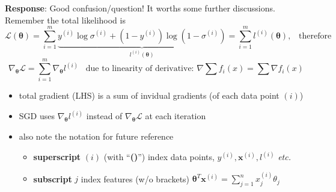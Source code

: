 \documentclass[ignorenonframetext,aspectratio=169]{beamer}
\providecommand{\tightlist}{%
  \setlength{\itemsep}{0pt}\setlength{\parskip}{0pt}}
\newcommand{\vv}[1]{\boldsymbol{#1}}
\newcommand{\di}[2]{\ensuremath{ #1^{(#2)}}}
\newcommand{\dd}[1]{\ensuremath{ #1^{(i)}}}
\newcommand{\Di}[2]{\ensuremath{ \vv{#1}^{(#2)}}}
\begin{document}
\begin{frame}{}
\protect\hypertarget{section}{}

\textbf{Response}: Good confusion/question! It worths some further
discussions. Remember the total likelihood is
\[\mathcal{L}(\vv{\theta}) =\sum_{i=1}^m  \underbrace{\dd{y} \log \sigma^{(i)}+(1-\dd{y})\log(1-\sigma^{(i)})}_{\dd{l}(\vv{\theta})}= \sum_{i=1}^m \dd{l}(\vv{\theta}), \;\;\; \text{therefore}\]
\[\nabla_{\vv{\theta}}\mathcal{L} = \sum_{i=1}^m\nabla_{\vv{\theta}}\dd{l}\;\;\; \text{due to linearity of derivative: } \nabla\sum f_i(x) = \sum \nabla f_i(x)\]

\begin{itemize}
\tightlist
\item
  total gradient (LHS) is a sum of invidual gradients (of each data
  point \((i)\))
\item
  SGD uses \(\nabla_{\vv{\theta}}\dd{l}\) instead of
  \(\nabla_{\vv{\theta}}\mathcal{L}\) at each iteration
\item
  also note the notation for future reference

  \begin{itemize}
  \tightlist
  \item
    \textbf{superscript} \((i)\) (with ``\textbf{()}'') index data
    points, \(y^{(i)}, \Di{x}{i}, \di{l}{i}\) \textit{etc.}
  \item
    \textbf{subscript} \(j\) index features (w/o brackets)
    \(\vv{\theta}^T\Di{x}{i} = \sum_{j=1}^n \di{x_{j}}{i}\theta_j\)
  \end{itemize}
\end{itemize}

\end{frame}
\end{document}
